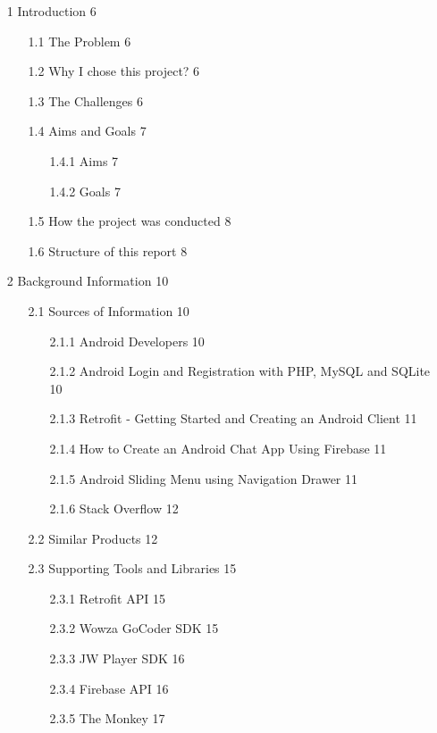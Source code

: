 \documentclass{article}
\begin{document}
\begin{itemize}
    	\item [1] Introduction \hfill6
	\begin{itemize}
		\item [1.1] The Problem  \hfill6
		\item [1.2] Why I chose this project? \hfill6
		\item [1.3] The Challenges \hfill6
		\item [1.4] Aims and Goals  \hfill7
		\begin{itemize}
			\item [1.4.1] Aims \hfill7
			\item [1.4.2] Goals \hfill7
		\end{itemize}
		\item [1.5] How the project was conducted \hfill8
		\item [1.6] Structure of this report \hfill8
	\end{itemize}
    	\item [2] Background Information \hfill10
	\begin{itemize}
		\item [2.1] Sources of Information \hfill10
		\begin{itemize}
			\item [2.1.1] Android Developers \hfill10
			\item [2.1.2] Android Login and Registration with PHP, MySQL and SQLite \hfill10
			\item [2.1.3] Retrofit - Getting Started and Creating an Android Client \hfill11
			\item [2.1.4] How to Create an Android Chat App Using Firebase \hfill11
			\item [2.1.5] Android Sliding Menu using Navigation Drawer \hfill11
			\item [2.1.6] Stack Overflow \hfill12
		\end{itemize}
		\item [2.2] Similar Products \hfill12
		\item [2.3] Supporting Tools and Libraries \hfill15
		\begin{itemize}
			\item [2.3.1] Retrofit API \hfill15
			\item [2.3.2] Wowza GoCoder SDK \hfill15
			\item [2.3.3] JW Player SDK \hfill16
			\item [2.3.4] Firebase API \hfill16
			\item [2.3.5] The Monkey \hfill17

\end{itemize}
\end{itemize}
\end{itemize}
\end{document}
